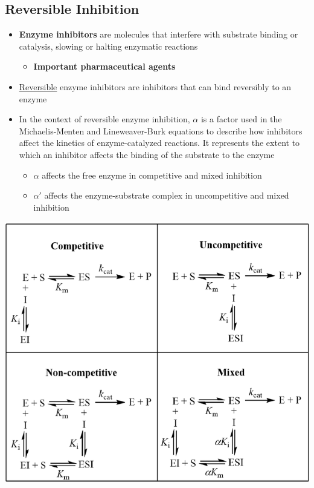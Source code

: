 \documentclass[10pt]{article}
\begin{document}
\subsection*{Reversible Inhibition}
\begin{itemize}
    \item \textbf{Enzyme inhibitors} are molecules that interfere with substrate binding or catalysis, slowing or halting enzymatic reactions
    \begin{itemize}
        \item \textbf{Important pharmaceutical agents}
    \end{itemize}
    \item \underline{Reversible} enzyme inhibitors are inhibitors that can bind reversibly to an enzyme
    \item In the context of reversible enzyme inhibition, $\alpha$ is a factor used in the Michaelis-Menten and Lineweaver-Burk equations to describe how inhibitors affect the kinetics of enzyme-catalyzed reactions.  It represents the extent to which an inhibitor affects the binding of the substrate to the enzyme
    \begin{itemize}
        \item $\alpha$ affects the free enzyme in competitive and mixed inhibition
        \item $\alpha'$ affects the enzyme-substrate complex in uncompetitive and mixed inhibition
    \end{itemize}
\end{itemize}
\begin{center}
    \includegraphics*[scale=0.5]{L1_12.png}
\end{center}
\end{document}
